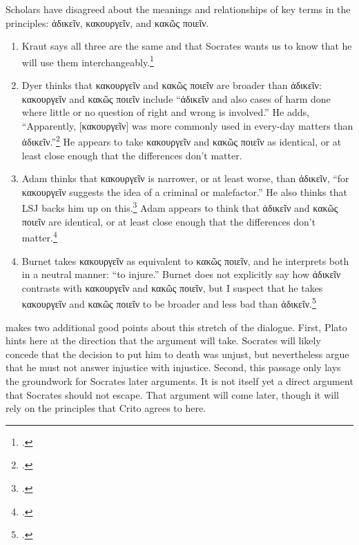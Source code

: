 \documentclass[12pt,letterpaper]{article}
\begin{document}
Scholars have disagreed about the meanings and relationships of key terms in the principles: \textgreek{ἀδικεῖν}, \textgreek{κακουργεῖν}, and \textgreek{κακῶς ποιεῖν}.

\begin{enumerate}
    \item Kraut says all three are the same and that Socrates wants us to know that he will use them interchangeably.\footcite[][25--27]{kraut-socrates-state-1984}
    \item Dyer thinks that \textgreek{κακουργεῖν} and \textgreek{κακῶς ποιεῖν} are broader than \textgreek{ἀδικεῖν}: \textgreek{κακουργεῖν} and \textgreek{κακῶς ποιεῖν} include ``\textgreek{ἀδικεῖν} and also cases of harm done where little or no question of right and wrong is involved.'' He adds, ``Apparently, [\textgreek{κακουργεῖν}] was more commonly used in every-day matters than \textgreek{ἀδικεῖν}.''\footcite[][on 49c2]{dyer-apology-crito-2007} He appears to take \textgreek{κακουργεῖν} and \textgreek{κακῶς ποιεῖν} as identical, or at least close enough that the differences don't matter.
    \item Adam thinks that \textgreek{κακουργεῖν} is narrower, or at least worse, than \textgreek{ἀδικεῖν}, ``for \textgreek{κακουργεῖν} suggests the idea of a criminal or malefactor.'' He also thinks that LSJ backs him up on this.\footcite[][on 49c3]{adam1988-crito} Adam appears to think that \textgreek{ἀδικεῖν} and \textgreek{κακῶς ποιεῖν} are identical, or at least close enough that the differences don't matter.\footcite[This is how I understand his reference to \textit{Republic} 335b, where ``\textgreek{ἀδικεῖν} is identified with \textgreek{κακοὺς ποιεῖν} rather than \textgreek{κακῶς ποιεῖν} through the middle term \textgreek{βλάπτειν}.''][on 49c7]{adam1988-crito}
    \item Burnet takes \textgreek{κακουργεῖν} as equivalent to \textgreek{κακῶς ποιεῖν}, and he interprets both in a neutral manner: ``to injure.'' Burnet does not explicitly say how \textgreek{ἀδικεῖν} contrasts with \textgreek{κακουργεῖν} and \textgreek{κακῶς ποιεῖν}, but I suspect that he takes \textgreek{κακουργεῖν} and \textgreek{κακῶς ποιεῖν} to be broader and less bad than \textgreek{ἀδικεῖν}.\footcite[][on49c2]{burnet1924-euthyphro-apology-crito}
\end{enumerate}

\cite{kraut-socrates-state-1984} makes two additional good points about this stretch of the dialogue. First, Plato hints here at the direction that the argument will take. Socrates will likely concede that the decision to put him to death was unjust, but nevertheless argue that he must not answer injustice with injustice. Second, this passage only lays the groundwork for Socrates later arguments. It is not itself yet a direct argument that Socrates should not escape. That argument will come later, though it will rely on the principles that Crito agrees to here.
\end{document}
